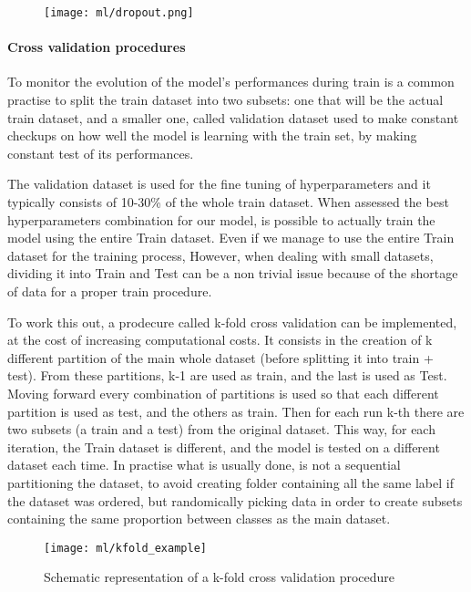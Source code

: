 \documentclass[a4paper,11pt]{article}
\begin{document}
\begin{figure}
\texttt{[image: ml/dropout.png]}
\caption{}
\label{fig:dropout}
\end{figure}

\paragraph{Cross validation procedures} \hfill
To monitor the evolution of the model's performances during train is a common practise to split the train dataset into two subsets: one that will be the actual train dataset, and a smaller one, called validation dataset used to make constant checkups on how well the model is learning with the train set, by making constant test of its performances.

The validation dataset is used for the fine tuning of hyperparameters and it typically consists of 10-30\% of the whole train dataset.
When assessed the best hyperparameters combination for our model, is possible to actually train the model using the entire Train dataset.
Even if we manage to use the entire Train dataset for the training process,
However, when dealing with small datasets, dividing it into Train and Test can be a non trivial issue because of the shortage of data for a proper train procedure.

To work this out, a prodecure called k-fold cross validation can be implemented, at the cost of increasing computational costs.
It consists in the creation of k different partition of the main whole dataset (before splitting it into train + test).
From these partitions, k-1 are used as train, and the last is used as Test. Moving forward every combination of partitions is used so that each different partition is used as test, and the others as train.
Then for each run k-th there are two subsets (a train and a test) from the original dataset. This way, for each iteration, the Train dataset is different, and the model is tested on a different dataset each time.
In practise what is usually done, is not a sequential partitioning the dataset, to avoid creating folder containing all the same label if the dataset was ordered, but randomically picking data in order to create subsets containing the same proportion between classes as the main dataset.


\begin{figure}
\texttt{[image: ml/kfold\_example]}
\caption{Schematic representation of a k-fold cross validation procedure}
\label{fig:kfold}
\end{figure}
\end{document}
